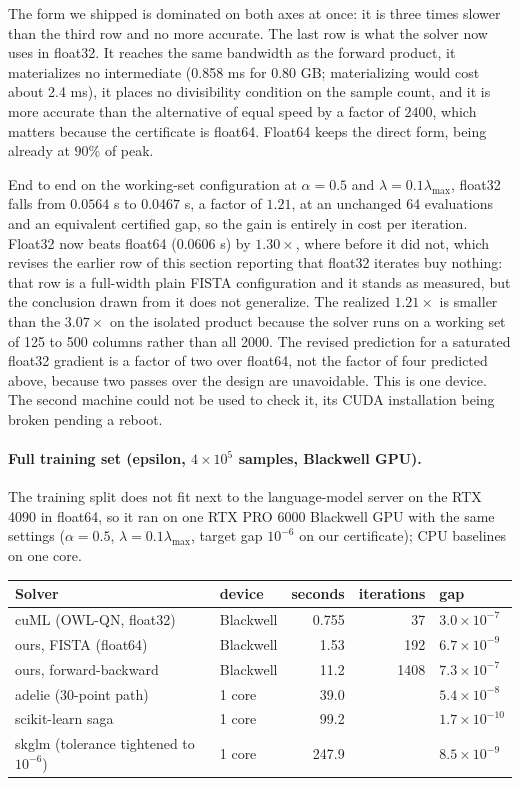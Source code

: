 The form we shipped is dominated on both axes at once: it is three times slower
than the third row and no more accurate. The last row is what the solver now
uses in float32. It reaches the same bandwidth as the forward product, it
materializes no intermediate (0.858 ms for 0.80 GB; materializing would cost
about 2.4 ms), it places no divisibility condition on the sample count, and it
is more accurate than the alternative of equal speed by a factor of $2400$,
which matters because the certificate is float64. Float64 keeps the direct form,
being already at $90\%$ of peak.

End to end on the working-set configuration at $\alpha=0.5$ and
$\lambda=0.1\lambda_{\max}$, float32 falls from $0.0564$ s to $0.0467$ s, a
factor of $1.21$, at an unchanged 64 evaluations and an equivalent certified
gap, so the gain is entirely in cost per iteration. Float32 now beats float64
($0.0606$ s) by $1.30\times$, where before it did not, which revises the earlier
row of this section reporting that float32 iterates buy nothing: that row is a
full-width plain FISTA configuration and it stands as measured, but the
conclusion drawn from it does not generalize. The realized $1.21\times$ is
smaller than the $3.07\times$ on the isolated product because the solver runs on
a working set of 125 to 500 columns rather than all 2000. The revised prediction
for a saturated float32 gradient is a factor of two over float64, not the factor
of four predicted above, because two passes over the design are unavoidable.
This is one device. The second machine could not be used to check it, its CUDA
installation being broken pending a reboot.

\paragraph{Full training set (epsilon, $4\times10^5$ samples, Blackwell GPU).}
The training split does not fit next to the language-model server on the
RTX 4090 in float64, so it ran on one RTX PRO 6000 Blackwell GPU with the same
settings ($\alpha=0.5$, $\lambda=0.1\lambda_{\max}$, target gap $10^{-6}$ on our
certificate); CPU baselines on one core. 

\begin{center}
\small
\begin{tabular}{llrrl}
\toprule
Solver & device & seconds & iterations & gap \\
\midrule
cuML (OWL-QN, float32) & Blackwell & 0.755 & 37 & $3.0\times10^{-7}$ \\
ours, FISTA (float64) & Blackwell & 1.53 & 192 & $6.7\times10^{-9}$ \\
ours, forward-backward & Blackwell & 11.2 & 1408 & $7.3\times10^{-7}$ \\
adelie (30-point path) & 1 core & 39.0 & & $5.4\times10^{-8}$ \\
scikit-learn saga & 1 core & 99.2 & & $1.7\times10^{-10}$ \\
skglm (tolerance tightened to $10^{-6}$) & 1 core & 247.9 & & $8.5\times10^{-9}$ \\
\bottomrule
\end{tabular}
\end{center}

